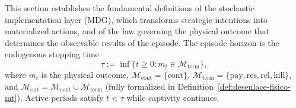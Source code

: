 \documentclass[12pt]{article}
\numberwithin{equation}{section}
\numberwithin{table}{section}
\theoremstyle{definition}
\begin{document}
\noindent This section establishes the fundamental definitions of the
stochastic implementation layer (MDG), which transforms strategic intentions
into materialized actions, and of the law governing the physical outcome that
determines the observable results of the episode. The episode horizon is the
endogenous stopping time
\begin{equation}
\label{eq:stopping-time}
\tau:=\inf\{t\ge 0:m_t\in\mathcal{M}_{\mathrm{term}}\},
\end{equation}
where $m_t$ is the physical outcome,
$\mathcal{M}_{\mathrm{cont}}=\{\mathrm{cont}\}$,
$\mathcal{M}_{\mathrm{term}}=\{\mathrm{pay},\mathrm{res},\mathrm{rel},\mathrm{kill}\}$,
and $\mathcal{M}_{\mathrm{out}}=\mathcal{M}_{\mathrm{cont}}\cup\mathcal{M}_{\mathrm{term}}$
(fully formalized in Definition~\ref{def:desenlace-fisico-mt}). Active
periods satisfy $t<\tau$ while captivity continues.

\end{document}
